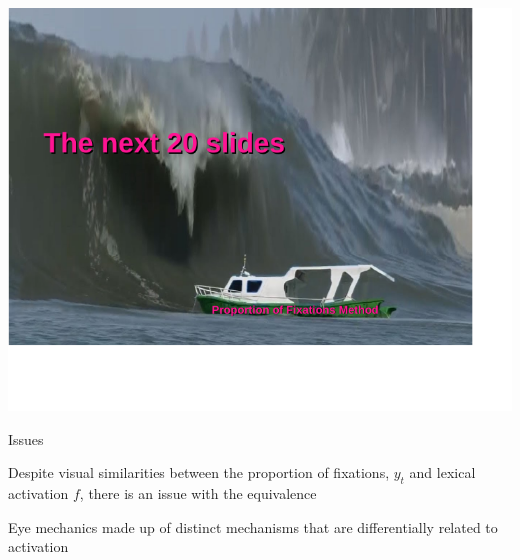 \documentclass{beamer}
\newcommand{\vp}{\vspace{2mm}}
\begin{document}
\begin{frame}
\begin{center}
\includegraphics[scale=1]{other_boat_meme.pdf}
\end{center}
\end{frame}


%
%
%
%
%
%

\begin{frame}{Issues}\large



Despite visual similarities between the proportion of fixations, $y_t$ and lexical activation $f$, there is an issue with the equivalence \vspace{6mm}


Eye mechanics made up of distinct mechanisms that are differentially related to activation 


\end{frame}
\end{document}
